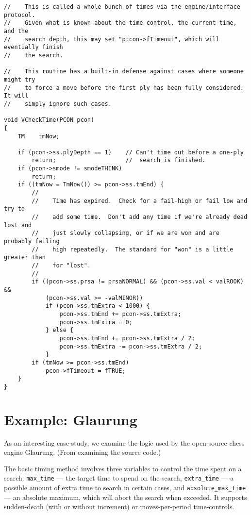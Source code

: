 \documentclass[10pt,dvipdfmx]{report}
\begin{document}
{\scriptsize
\begin{verbatim}
//    This is called a whole bunch of times via the engine/interface protocol.
//    Given what is known about the time control, the current time, and the
//    search depth, this may set "ptcon->fTimeout", which will eventually finish
//    the search.

//    This routine has a built-in defense against cases where someone might try
//    to force a move before the first ply has been fully considered.  It will
//    simply ignore such cases.

void VCheckTime(PCON pcon)
{
    TM    tmNow;

    if (pcon->ss.plyDepth == 1)    // Can't time out before a one-ply
        return;                    //  search is finished.
    if (pcon->smode != smodeTHINK)
        return;
    if ((tmNow = TmNow()) >= pcon->ss.tmEnd) {
        //
        //    Time has expired.  Check for a fail-high or fail low and try to
        //    add some time.  Don't add any time if we're already dead lost and
        //    just slowly collapsing, or if we are won and are probably failing
        //    high repeatedly.  The standard for "won" is a little greater than
        //    for "lost".
        //
        if ((pcon->ss.prsa != prsaNORMAL) && (pcon->ss.val < valROOK) &&
            (pcon->ss.val >= -valMINOR))
            if (pcon->ss.tmExtra < 1000) {
                pcon->ss.tmEnd += pcon->ss.tmExtra;
                pcon->ss.tmExtra = 0;
            } else {
                pcon->ss.tmEnd += pcon->ss.tmExtra / 2;
                pcon->ss.tmExtra -= pcon->ss.tmExtra / 2;
            }
        if (tmNow >= pcon->ss.tmEnd)
            pcon->fTimeout = fTRUE;
    }
}
\end{verbatim}
}


\section{Example: Glaurung}

As an interesting case-study, we examine the logic used by the open-source
chess engine Glaurung.  (From examining the source code.)

The basic timing method involves three variables to control the time
spent on a search:
\verb|max_time| --- the target time to spend on the search,
\verb|extra_time| --- a possible amount of extra time to search in certain
cases, and \verb|absolute_max_time| --- an absolute maximum, which will abort
the search when exceeded.
It supports sudden-death (with or without increment) or
moves-per-period time-controls.
\end{document}
